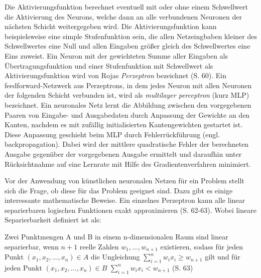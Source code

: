\documentclass[
	12pt,
	a4paper,
	BCOR10mm,
	DIV14,
	listof=totoc,
	bibliography=totoc,
	headsepline
]{scrreprt}
\begin{document}
Die Aktivierungsfunktion berechnet eventuell mit oder ohne einem Schwellwert die Aktivierung des Neurons, welche dann an alle verbundenen Neuronen der nächsten Schicht weitergegeben wird.
Die Aktivierungsfunktion kann beispielsweise eine simple Stufenfunktion sein, die allen Netzeingbaben kleiner des Schwellwertes eine Null und allen Eingaben größer gleich des Schwellwertes eine Eins zuweist.
Ein Neuron mit der gewichteten Summe aller Eingaben als Übertragungsfunktion und einer Stufenfunktion mit Schwellwert als Aktivierungsfunktion wird von Rojas \textit{Perzeptron} bezeichnet \cite{Rojas:1996:NNS:235222} (S. 60).
Ein feedforward-Netzwerk aus Perzeptrons, in dem jedes Neuron mit allen Neuronen der folgenden Schicht verbunden ist, wird als \textit{multilayer perceptron} (kurz MLP) bezeichnet.
Ein neuronales Netz lernt die Abbildung zwischen den vorgegebenen Paaren von Eingabe- und Ausgabedaten durch Anpassung der Gewichte an den Kanten, nachdem es mit zufällig initialisierten Kantengewichten gestartet ist.
Diese Anpassung geschieht beim MLP durch Fehlerrückführung (engl. backpropagation). Dabei wird der mittlere quadratische Fehler der berechneten Ausgabe gegenüber der vorgegebenen Ausgabe ermittelt und daraufhin unter Rücksichtnahme auf eine Lernrate mit Hilfe des Gradientenverfahren minimiert.

Vor der Anwendung von künstlichen neuronalen Netzen für ein Problem stellt sich die Frage, ob diese für das Problem geeignet sind. Dazu gibt es einige interessante mathematische Beweise.
Ein einzelnes Perzeptron kann alle linear separierbaren logischen Funktionen exakt approximieren \cite{Rojas:1996:NNS:235222} (S. 62-63). 
Wobei lineare Separierbarkeit definiert ist als:

Zwei Punktmengen A und B in einem n-dimensionalen Raum sind linear separierbar, wenn $n + 1$ reelle Zahlen $w_1,...,w_{n+1}$ existieren, sodass für jeden Punkt $(x_1,x_2,...,x_n) \in A$ die Ungleichung $\sum_{i=1}^{n} w_ix_i \ge w_{n+1}$ gilt und für jeden Punkt $(x_1,x_2,...,x_n) \in B$ $\sum_{i=1}^{n} w_ix_i < w_{n+1}$ \cite{Rojas:1996:NNS:235222} (S. 63)
\end{document}
